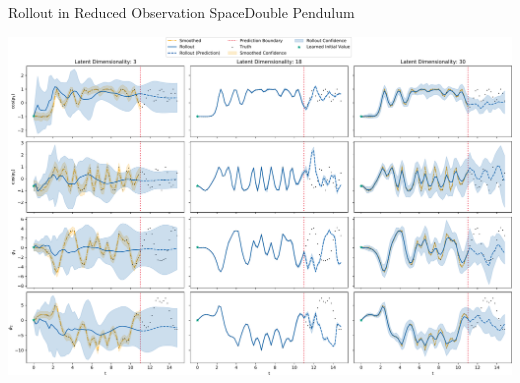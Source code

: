 \documentclass[
	aspectratio=43,
	color={accentcolor=1c},
	logo=false,
	colorframetitle=true,
	handout
]{tudabeamer}
\begin{document}
			\begin{frame}[c]{Rollout in Reduced Observation Space}{Double Pendulum}
				\vspace{-0.25cm}
				\begin{center}
					\includegraphics[width=0.875\linewidth]{figures/experiments/acrobot-gym/different-latent-dims-rollouts-reduced.pdf}
				\end{center}
			\end{frame}
\end{document}

